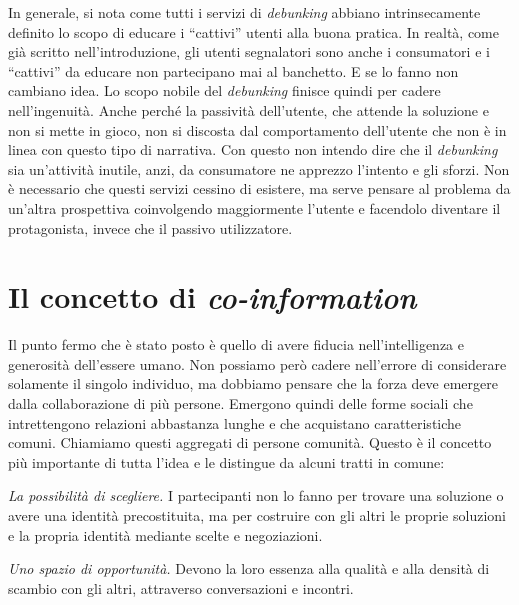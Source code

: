 \documentclass{article}
\begin{document}
In generale, si nota come tutti i servizi di \textit{debunking} abbiano intrinsecamente definito lo scopo di educare i “cattivi” utenti alla buona pratica. In realtà, come già scritto nell’introduzione, gli utenti segnalatori sono anche i consumatori e i “cattivi” da educare non partecipano mai al banchetto. E se lo fanno non cambiano idea. Lo scopo nobile del \textit{debunking} finisce quindi per cadere nell’ingenuità. Anche perché la passività dell’utente, che attende la soluzione e non si mette in gioco, non si discosta dal comportamento dell’utente che non è in linea con questo tipo di narrativa. Con questo non intendo dire che il \textit{debunking} sia un’attività inutile, anzi, da consumatore ne apprezzo l’intento e gli sforzi. Non è necessario che questi servizi cessino di esistere, ma  serve pensare al problema da un’altra prospettiva coinvolgendo maggiormente l’utente e facendolo diventare il protagonista, invece che il passivo utilizzatore.

\section{Il concetto di \textit{co-information}}
\label{sec:co-inf}

Il punto fermo che è stato posto è quello di avere fiducia nell’intelligenza e generosità dell’essere umano. Non possiamo però cadere nell’errore di considerare solamente il singolo individuo, ma dobbiamo pensare che la forza deve emergere dalla collaborazione di più persone. Emergono quindi delle forme sociali che intrettengono relazioni abbastanza lunghe e che acquistano caratteristiche comuni. Chiamiamo questi aggregati di persone comunità. Questo è il concetto più importante di tutta l’idea e \textcite{manzini_politiche_2018} le distingue da alcuni tratti in comune:

\vspace{0.5 cm}

\textit{La possibilità di scegliere.} I partecipanti non lo fanno per trovare una soluzione o avere una identità precostituita, ma per costruire con gli altri le proprie soluzioni e la propria identità mediante scelte e negoziazioni.

\vspace{0.5 cm}

\textit{Uno spazio di opportunità.} Devono la loro essenza alla qualità e alla densità di scambio con gli altri, attraverso conversazioni e incontri.

\vspace{0.5 cm}
\end{document}
